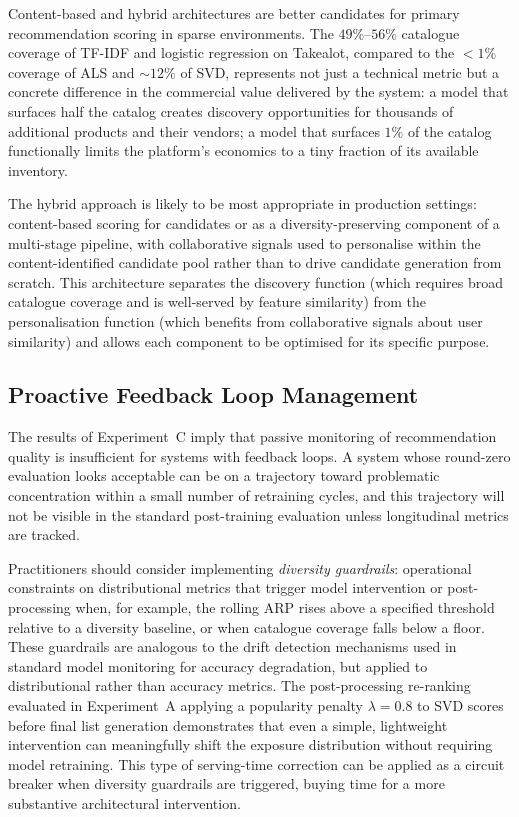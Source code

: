 \documentclass[11pt,a4paper]{report}
\begin{document}
Content-based and hybrid architectures are better candidates for primary recommendation scoring in sparse environments. The $49\%$--$56\%$ catalogue coverage of TF-IDF and logistic regression on Takealot, compared to the $<1\%$ coverage of ALS and $\sim 12\%$ of SVD, represents not just a technical metric but a concrete difference in the commercial value delivered by the system: a model that surfaces half the catalog creates discovery opportunities for thousands of additional products and their vendors; a model that surfaces $1\%$ of the catalog functionally limits the platform's economics to a tiny fraction of its available inventory.

The hybrid approach is likely to be most appropriate in production settings: content-based scoring for candidates or as a diversity-preserving component of a multi-stage pipeline, with collaborative signals used to personalise within the content-identified candidate pool rather than to drive candidate generation from scratch. This architecture separates the discovery function (which requires broad catalogue coverage and is well-served by feature similarity) from the personalisation function (which benefits from collaborative signals about user similarity) and allows each component to be optimised for its specific purpose.

\subsection*{Proactive Feedback Loop Management}

The results of Experiment~C imply that passive monitoring of recommendation quality is insufficient for systems with feedback loops. A system whose round-zero evaluation looks acceptable can be on a trajectory toward problematic concentration within a small number of retraining cycles, and this trajectory will not be visible in the standard post-training evaluation unless longitudinal metrics are tracked.

Practitioners should consider implementing \emph{diversity guardrails}: operational constraints on distributional metrics that trigger model intervention or post-processing when, for example, the rolling ARP rises above a specified threshold relative to a diversity baseline, or when catalogue coverage falls below a floor. These guardrails are analogous to the drift detection mechanisms used in standard model monitoring for accuracy degradation, but applied to distributional rather than accuracy metrics. The post-processing re-ranking evaluated in Experiment~A applying a popularity penalty $\lambda = 0.8$ to SVD scores before final list generation demonstrates that even a simple, lightweight intervention can meaningfully shift the exposure distribution without requiring model retraining. This type of serving-time correction can be applied as a circuit breaker when diversity guardrails are triggered, buying time for a more substantive architectural intervention.
\end{document}
